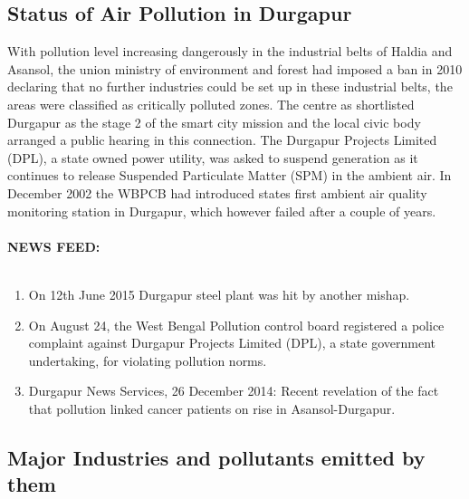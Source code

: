 \subsection{Status of Air Pollution in Durgapur}
With pollution level increasing dangerously in the industrial belts of Haldia and Asansol, the union ministry of environment and forest had imposed a ban in 2010 declaring that no further industries could be set up in these industrial belts, the areas were classified as critically polluted zones. The centre as shortlisted Durgapur as the stage 2 of the smart city mission and the local civic body arranged a public hearing in this connection. The Durgapur Projects Limited (DPL), a state owned power utility, was asked to suspend generation as it continues to release Suspended Particulate Matter (SPM) in the ambient air. In December 2002 the WBPCB had introduced states first ambient air quality monitoring station in Durgapur, which however failed after a couple of years.
\\
\\
\textbf{NEWS FEED:}
\\
\\
\begin{enumerate}
	\item On 12th June 2015 Durgapur steel plant was hit by another mishap.
	\item On August 24, the West Bengal Pollution control board registered a police complaint against Durgapur Projects Limited (DPL), a state government undertaking, for violating pollution norms.
	\item Durgapur News Services, 26 December 2014: Recent revelation of the fact that pollution linked cancer patients on rise in Asansol-Durgapur.
\end{enumerate}

\subsection{Major Industries and pollutants emitted by them}

